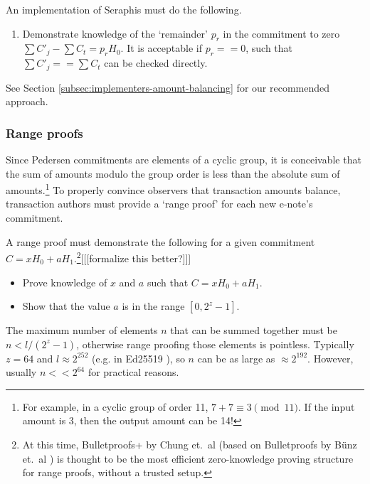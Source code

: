 An implementation of Seraphis must do the following.

\begin{enumerate}
    \item Demonstrate knowledge of the `remainder' $p_r$ in the commitment to zero $\sum C'_j - \sum C_t = p_r H_0$. It is acceptable if $p_r == 0$, such that $\sum C'_j == \sum C_t$ can be checked directly.
\end{enumerate}

See Section \ref{subsec:implementers-amount-balancing} for our recommended approach.

\subsubsection{Range proofs}
\label{subsubsec:confidential-transactions-range-proofs}

Since Pedersen commitments are elements of a cyclic group, it is conceivable that the sum of amounts modulo the group order is less than the absolute sum of amounts.\footnote{For example, in a cyclic group of order 11, $7 + 7 \equiv 3 \pmod{11}$. If the input amount is 3, then the output amount can be 14!} To properly convince observers that transaction amounts balance, transaction authors must provide a `range proof' for each new e-note's commitment.

A range proof must demonstrate the following for a given commitment $C = x H_0 + a H_1$.\footnote{At this time, Bulletproofs+ by Chung et.\ al \cite{bulletproofs_plus} (based on Bulletproofs by B\"{u}nz et.\ al \cite{Bulletproofs_paper}) is thought to be the most efficient zero-knowledge proving structure for range proofs, without a trusted setup.}[[[formalize this better?]]]

\begin{itemize}
    \item Prove knowledge of $x$ and $a$ such that $C = x H_0 + a H_1$.

    \item Show that the value $a$ is in the range $[0, 2^{z} - 1]$.
\end{itemize}

The maximum number of elements $n$ that can be summed together must be $n < l / (2^z - 1)$, otherwise range proofing those elements is pointless. Typically $z = 64$ and $l \approx 2^{252}$ (e.g. in Ed25519 \cite{Bernstein2012-high-speed-high-security-ed25519}), so $n$ can be as large as $\approx 2^{192}$. However, usually $n << 2^{64}$ for practical reasons.

